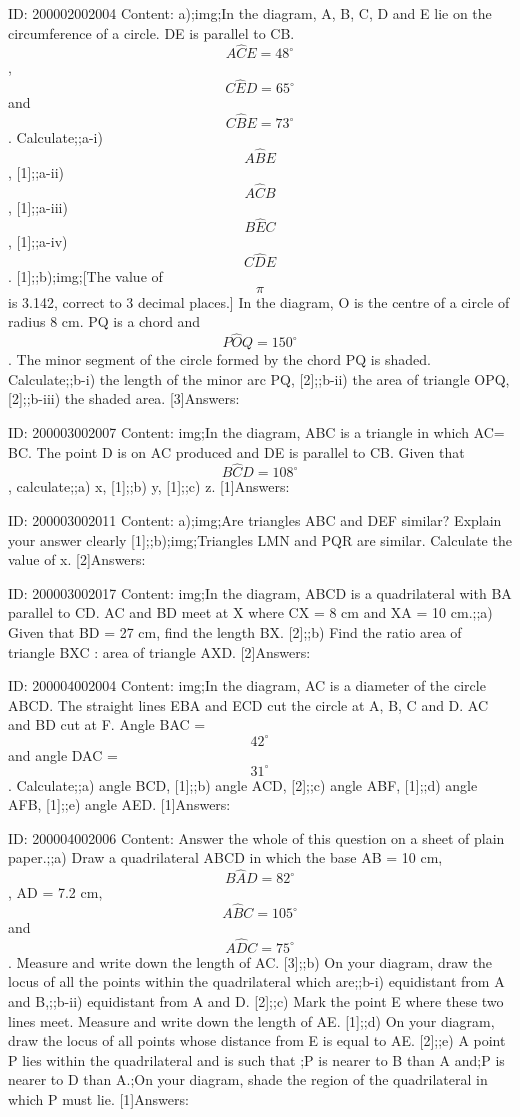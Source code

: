 \documentclass{article}
\begin{document}
ID: 200002002004
Content:
a);img;In the diagram, A, B, C, D and E lie on the circumference of a circle. DE is parallel to CB. $$A \hat CE=48^{\circ}$$, $$C \hat ED=65^{\circ}$$ and $$C \hat BE=73^{\circ}$$. Calculate;;a-i) $$A \hat BE$$, [1];;a-ii) $$A \hat CB$$, [1];;a-iii) $$B \hat EC$$, [1];;a-iv) $$C \hat DE$$. [1];;b);img;[The value of $$\pi$$ is 3.142, correct to 3 decimal places.] In the diagram, O is the centre of a circle of radius 8 cm. PQ is a chord and $$P \hat OQ=150^{\circ}$$. The minor segment of the circle formed by the chord PQ is shaded. Calculate;;b-i) the length of the minor arc PQ, [2];;b-ii) the area of triangle OPQ, [2];;b-iii) the shaded area. [3]Answers:

ID: 200003002007
Content:
img;In the diagram, ABC is a triangle in which AC= BC. The point D is on AC produced and DE is parallel to CB. Given that $$B \hat CD = 108^{\circ}$$, calculate;;a) x, [1];;b) y, [1];;c) z. [1]Answers:

ID: 200003002011
Content:
a);img;Are triangles ABC and DEF similar? Explain your answer clearly [1];;b);img;Triangles LMN and PQR are similar. Calculate the value of x. [2]Answers:

ID: 200003002017
Content:
img;In the diagram, ABCD is a quadrilateral with BA parallel to CD. AC and BD meet at X where CX = 8 cm and XA = 10 cm.;;a) Given that BD = 27 cm, find the length BX. [2];;b) Find the ratio area of triangle BXC : area of triangle AXD. [2]Answers:

ID: 200004002004
Content:
img;In the diagram, AC is a diameter of the circle ABCD. The straight lines EBA and ECD cut the circle at A, B, C and D. AC and BD cut at F. Angle BAC = $$42^{\circ}$$ and angle DAC = $$31^{\circ}$$. Calculate;;a) angle BCD, [1];;b) angle ACD, [2];;c) angle ABF, [1];;d) angle AFB, [1];;e) angle AED. [1]Answers:

ID: 200004002006
Content:
Answer the whole of this question on a sheet of plain paper.;;a) Draw a quadrilateral ABCD in which the base AB = 10 cm, $$B \hat AD = 82^{\circ}$$,  AD = 7.2 cm, $$A \hat BC = 105^{\circ}$$ and $$A \hat DC = 75^{\circ}$$. Measure and write down the length of AC. [3];;b) On your diagram, draw the locus of all the points within the quadrilateral which are;;b-i) equidistant from A and B,;;b-ii) equidistant from A and D. [2];;c) Mark the point E where these two lines meet. Measure and write down the length of AE. [1];;d) On your diagram, draw the locus of all points whose distance from E is equal to AE. [2];;e) A point P lies within the quadrilateral and is such that ;P is nearer to B than A and;P is nearer to D than A.;On your diagram, shade the region of the quadrilateral in which P must lie. [1]Answers:
\end{document}
